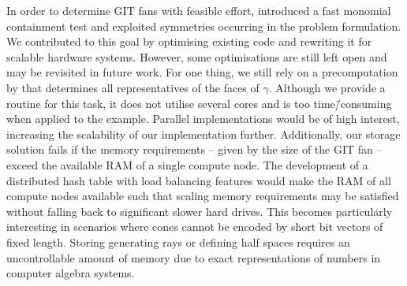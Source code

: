 In order to determine GIT fans with feasible effort, \citeauthor{gitfan_symmetry} introduced a fast monomial containment test and exploited symmetries occurring in the problem formulation. We contributed to this goal by optimising existing code and rewriting it for scalable hardware systems. However, some optimisations are still left open and may be revisited in future work. For one thing, we still rely on a precomputation by \gap{} that determines all representatives of the faces of $\gamma$. Although we provide a routine for this task, it does not utilise several cores and is too time\=/consuming when applied to the \msix{} example. Parallel implementations would be of high interest, increasing the scalability of our implementation further. Additionally, our storage solution fails if the memory requirements -- given by the size of the GIT fan -- exceed the available RAM of a single compute node. The development of a distributed hash table with load balancing features would make the RAM of all compute nodes available such that scaling memory requirements may be satisfied without falling back to significant slower hard drives. This becomes particularly interesting in scenarios where cones cannot be encoded by short bit vectors of fixed length. Storing generating rays or defining half spaces requires an uncontrollable amount of memory due to exact representations of numbers in computer algebra systems.